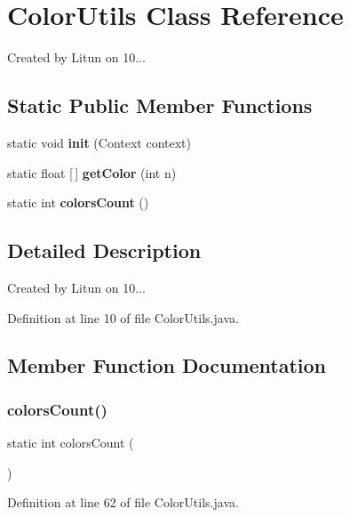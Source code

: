 \section{Color\+Utils Class Reference}
\label{classsf_1_1unitingtwist_1_1_color_utils}


Created by Litun on 10...  


\subsection*{Static Public Member Functions}
\begin{DoxyCompactItemize}
\item 
static void \textbf{ init} (Context context)
\item 
static float [$\,$] \textbf{ get\+Color} (int n)
\item 
static int \textbf{ colors\+Count} ()
\end{DoxyCompactItemize}


\subsection{Detailed Description}
Created by Litun on 10... 

Definition at line 10 of file Color\+Utils.\+java.



\subsection{Member Function Documentation}
\mbox{\label{classsf_1_1unitingtwist_1_1_color_utils_ac3c1b83de2ac679481c2a1f30e47779e}} 
\subsubsection{colors\+Count()}
{\footnotesize\ttfamily static int colors\+Count (\begin{DoxyParamCaption}{ }\end{DoxyParamCaption})\hspace{0.3cm}{\ttfamily [static]}}



Definition at line 62 of file Color\+Utils.\+java.

